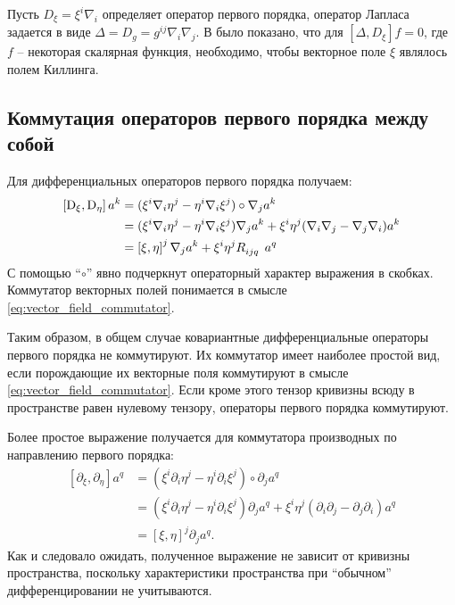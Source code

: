 \documentclass[12pt,a4paper]{article}
\begin{document}
            Пусть $D_\xi = \xi^i \nabla_i$ определяет оператор первого порядка, оператор Лапласа задается в виде $\Delta = D_g = g^{ij} \nabla_i \nabla_j$. В \cite{differential_operator_commutators} было показано, что для $[\Delta, D_\xi] f = 0$, где $f$ -- некоторая скалярная функция, необходимо, чтобы векторное поле $\xi$ являлось полем Киллинга.

        \subsection{Коммутация операторов первого порядка между собой}

            Для дифференциальных операторов первого порядка получаем:
            \begin{equation}\begin{aligned}
                \left[ \operatorname{D}_\xi, \operatorname{D}_\eta \right] a^k
                    &= (\xi^i \nabla_i \eta^j - \eta^i \nabla_i \xi^j) \circ \nabla_j a^k \\
                    &= (\xi^i \nabla_i \eta^j - \eta^i \nabla_i \xi^j) \nabla_j a^k
                        + \xi^i \eta^j (\nabla_i \nabla_j - \nabla_j \nabla_i) a^k \\
                    &= \left[ \xi, \eta \right]^j \nabla_j a^k
                        + \xi^i \eta^j R_{ijq}^{\hphantom{ijqk}} a^q
            \end{aligned}\end{equation}
            С помощью \enquote{$\circ$} явно подчеркнут операторный характер выражения в скобках. Коммутатор векторных полей понимается в смысле \autoref{eq:vector_field_commutator}.

            Таким образом, в общем случае ковариантные дифференциальные операторы первого порядка не коммутируют. Их коммутатор имеет наиболее простой вид, если порождающие их векторные поля коммутируют в смысле \autoref{eq:vector_field_commutator}. Если кроме этого тензор кривизны всюду в пространстве равен нулевому тензору, операторы первого порядка коммутируют.

            Более простое выражение получается для коммутатора производных по направлению первого порядка:
            \begin{equation}\begin{aligned}
                \left[ \partial_\xi, \partial_\eta \right] a^q
                    &= (\xi^i \partial_i \eta^j - \eta^i \partial_i \xi^j) \circ \partial_j a^q \\
                    &= (\xi^i \partial_i \eta^j - \eta^i \partial_i \xi^j) \partial_j a^q
                        + \xi^i \eta^j (\partial_i \partial_j - \partial_j \partial_i) a^q \\
                    &= \left[ \xi, \eta \right]^j \partial_j a^q .
            \end{aligned}\end{equation}
            Как и следовало ожидать, полученное выражение не зависит от кривизны пространства, поскольку характеристики пространства при \enquote{обычном} дифференцировании не учитываются.
\end{document}
